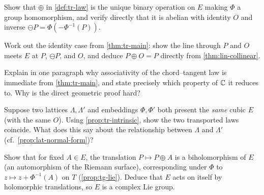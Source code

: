 \begin{exercise}
\label{ex:tr-unique-transport}
Show that \(\oplus\) in \cref{def:tr-law} is the unique binary operation on \(E\)
making \(\Phi\) a group homomorphism, and verify directly that it is abelian with
identity \(O\) and inverse \(\ominus P = \Phi(-\Phi^{-1}(P))\).
\end{exercise}

\begin{exercise}
\label{ex:tr-identity-case}
Work out the identity case from \cref{thm:tr-main}: show the line through \(P\) and
\(O\) meets \(E\) at \(P\), \(\ominus P\), and \(O\), and deduce \(P \oplus O = P\)
directly from \cref{thm:lin-collinear}.
\end{exercise}

\begin{exercise}
\label{ex:tr-associativity-free}
Explain in one paragraph why associativity of the chord--tangent law is immediate
from \cref{thm:tr-main}, and state precisely which property of \(\mathbb{C}\) it reduces
to. Why is the direct geometric proof hard?
\end{exercise}

\begin{exercise}
\label{ex:tr-intrinsic}
Suppose two lattices \(\Lambda, \Lambda'\) and embeddings \(\Phi, \Phi'\) both
present the \emph{same} cubic \(E\) (with the same \(O\)). Using
\cref{prop:tr-intrinsic}, show the two transported laws coincide. What does this
say about the relationship between \(\Lambda\) and \(\Lambda'\) (cf.\
\cref{prop:lat-normal-form})?
\end{exercise}

\begin{exercise}
\label{ex:tr-translation}
Show that for fixed \(A \in E\), the translation \(P \mapsto P \oplus A\) is a
biholomorphism of \(E\) (an automorphism of the Riemann surface), corresponding
under \(\Phi\) to \(z \mapsto z + \Phi^{-1}(A)\) on \(T\)
(\cref{prop:tg-lie}). Deduce that \(E\) acts on itself by holomorphic
translations, so \(E\) is a complex Lie group.
\end{exercise}
